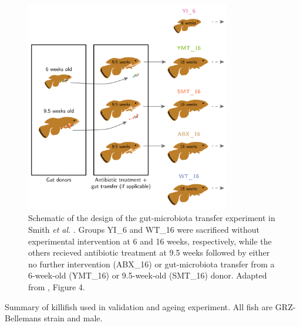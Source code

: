 \begin{figure}
\centering
\includegraphics[width = 0.8\textwidth]{_Figures/png_edited/gut-design}
\caption{Schematic of the design of the gut-microbiota transfer experiment in Smith \textit{et al.} \parencite{smith2017microbiota}. Groups YI\_6 and WT\_16 were sacrificed without experimental intervention at 6 and 16 weeks, respectively, while the others recieved antibiotic treatment at 9.5 weeks followed by either no further intervention (ABX\_16) or gut-microbiota transfer from a 6-week-old (YMT\_16) or 9.5-week-old (SMT\_16) donor. Adapted from \parencite{smith2017microbiota}, Figure 4.}
\label{fig:igseq-gut-design}
\end{figure}

\begin{table}[b]
\centering

\caption{Summary of killifish used in \igseq validation and ageing experiment. All fish are GRZ-Bellemans strain and male.}
\label{tab:gut-cohorts-summary}
\end{table}

